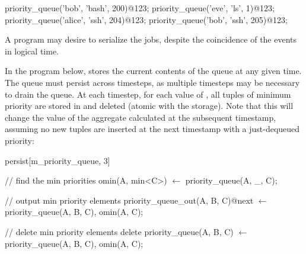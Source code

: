 \begin{Dedalus}
priority\_queue('bob', 'bash', 200)@123;
priority\_queue('eve', 'ls', 1)@123;
priority\_queue('alice', 'ssh', 204)@123;
priority\_queue('bob', 'ssh', 205)@123;
\end{Dedalus}

A program may desire to serialize the jobs, despite the coincidence of the
 events in logical time.



In the program below,  stores the current contents of
the queue at any given time.  The queue must persist across timesteps, as
multiple timesteps may be necessary to drain the queue.  At each timestep, for
each value of , all tuples of minimum priority are stored in
 and deleted (atomic with the storage).  Note
that this will change the value of the aggregate calculated at the subsequent
timestamp, assuming no new tuples are inserted at the next timestamp with a
just-dequeued priority:

\begin{Dedalus}
persist[m\_priority\_queue, 3]

// find the min priorities
omin(A, min<C>) \(\leftarrow\)
  priority\_queue(A, _, C);

// output min priority elements
priority_queue_out(A, B, C)@next \(\leftarrow\)
  priority\_queue(A, B, C), omin(A, C);

// delete min priority elements
delete priority\_queue(A, B, C) \(\leftarrow\)
  priority\_queue(A, B, C), omin(A, C);
\end{Dedalus}


